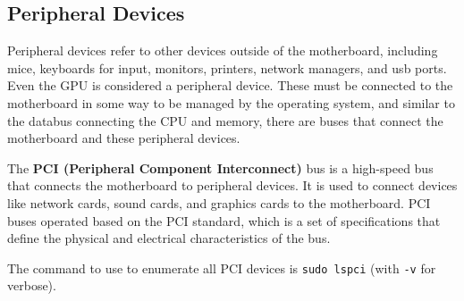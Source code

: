   \subsection{Peripheral Devices} 
    
    Peripheral devices refer to other devices outside of the motherboard, including mice, keyboards for input, monitors, printers, network managers, and usb ports. Even the GPU is considered a peripheral device. These must be connected to the motherboard in some way to be managed by the operating system, and similar to the databus connecting the CPU and memory, there are buses that connect the motherboard and these peripheral devices. 

    \begin{definition}
      \label{def:pci-bus}
      The \textbf{PCI (Peripheral Component Interconnect)} bus is a high-speed bus that connects the motherboard to peripheral devices. It is used to connect devices like network cards, sound cards, and graphics cards to the motherboard. PCI buses operated based on the PCI standard, which is a set of specifications that define the physical and electrical characteristics of the bus. 
    \end{definition}

    The command to use to enumerate all PCI devices is \texttt{sudo lspci} (with \texttt{-v} for verbose). 
    
